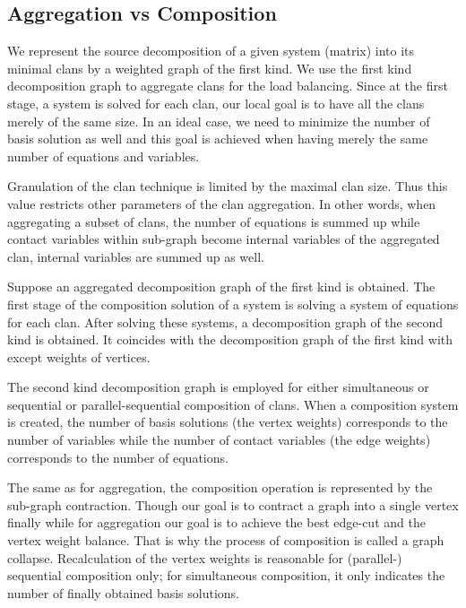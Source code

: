 \documentclass[10pt, a5paper]{article}
\begin{document}
\subsection*{Aggregation vs Composition}

We represent the source decomposition of a given system (matrix) into its minimal clans by a weighted graph of the first kind. We use the first kind decomposition graph to aggregate clans for the load balancing. Since at the first stage, a system is solved for each clan, our local goal is to have all the clans merely of the same size. In an ideal case, we need to minimize the number of basis solution as well and this goal is achieved when having merely the same number of equations and variables.

Granulation of the clan technique is limited by the maximal clan size. Thus this value restricts other parameters of the clan aggregation. In other words, when aggregating a subset of clans, the number of equations is summed up while contact variables within sub-graph become internal variables of the aggregated clan, internal variables are summed up as well.

Suppose an aggregated decomposition graph of the first kind is obtained. The first stage of the composition solution of a system is solving a system of equations for each clan. After solving these systems, a decomposition graph of the second kind is obtained. It coincides with the decomposition graph of the first kind with except weights of vertices.

The second kind decomposition graph is employed for either \linebreak simultaneous or sequential or parallel-sequential composition of clans. When a composition system is created, the number of basis solutions (the vertex weights) corresponds to the number of variables while the number of contact variables (the edge weights) corresponds to the number of equations.

The same as for aggregation, the composition operation is \linebreak represented by the sub-graph contraction. Though our goal is to contract a graph into a single vertex finally while for aggregation our goal is to achieve the best edge-cut and the vertex weight balance. That is why the process of composition is called a graph collapse. Recalculation of the vertex weights is reasonable for (parallel-) sequential composition only; for simultaneous composition, it only indicates the number of finally obtained basis solutions.
\end{document}
